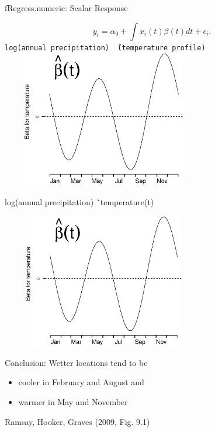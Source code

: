 \documentclass[compress]{beamer}
\begin{document}

\begin{frame}{fRegress.numeric:  Scalar Response}

\[ y_i = \alpha_0 + \int x_i(t) \beta(t) d t + \epsilon_i. \]
\texttt{log(annual precipitation) \~\ (temperature profile)}
\includegraphics[height=6cm, width=9cm]{figs/precbeta5b}

\end{frame}


\begin{frame}{log(annual precipitation) \~\ temperature(t) }

\includegraphics[height=5.9cm, width=9cm]{figs/precbeta5b}

Conclusion:  Wetter locations tend to be
\begin{itemize}
  \item cooler in February and August and
  \item warmer in May and November
\end{itemize}
Ramsay, Hooker, Graves (2009, Fig. 9.1)

\end{frame}
\end{document}
